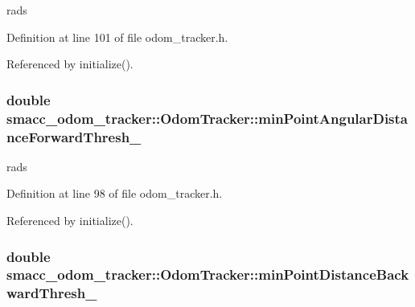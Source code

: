 rads 



Definition at line 101 of file odom\+\_\+tracker.\+h.



Referenced by initialize().

\subsubsection[{\texorpdfstring{min\+Point\+Angular\+Distance\+Forward\+Thresh\+\_\+}{minPointAngularDistanceForwardThresh_}}]{\setlength{\rightskip}{0pt plus 5cm}double smacc\+\_\+odom\+\_\+tracker\+::\+Odom\+Tracker\+::min\+Point\+Angular\+Distance\+Forward\+Thresh\+\_\+\hspace{0.3cm}{\ttfamily [protected]}}\hypertarget{classsmacc__odom__tracker_1_1OdomTracker_a1611f6e11f48e8c2bdf6d16adf35fa2a}{}\label{classsmacc__odom__tracker_1_1OdomTracker_a1611f6e11f48e8c2bdf6d16adf35fa2a}


rads 



Definition at line 98 of file odom\+\_\+tracker.\+h.



Referenced by initialize().

\subsubsection[{\texorpdfstring{min\+Point\+Distance\+Backward\+Thresh\+\_\+}{minPointDistanceBackwardThresh_}}]{\setlength{\rightskip}{0pt plus 5cm}double smacc\+\_\+odom\+\_\+tracker\+::\+Odom\+Tracker\+::min\+Point\+Distance\+Backward\+Thresh\+\_\+\hspace{0.3cm}{\ttfamily [protected]}}\hypertarget{classsmacc__odom__tracker_1_1OdomTracker_a79d94520c5da1852602aaf264377a82f}{}\label{classsmacc__odom__tracker_1_1OdomTracker_a79d94520c5da1852602aaf264377a82f}



